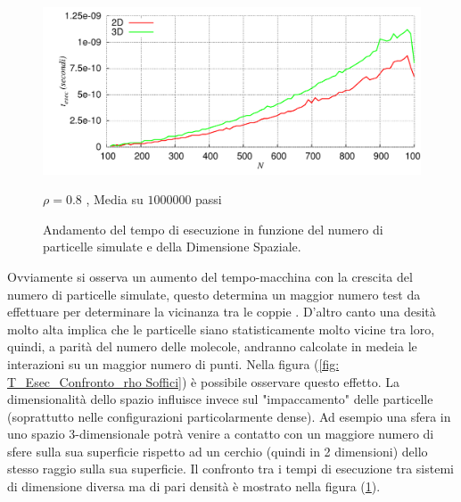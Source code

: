 	\begin{figure}[htbp]
		\centering
		\caption[Sfere Soffici$/$Preliminari\_TempoEsecuzione.cpp]{Andamento del tempo di esecuzione in funzione del numero di particelle simulate e della Dimensione Spaziale.}\label{fig: T_Esec_Confronto_D Soffici}\vspace{-15pt}
		\includegraphics[scale=0.85]{Immagini/Soffici/TempoEsecuzione_ConfrontoD}

		\centering  \footnotesize{$\rho=0.8$ , Media su $ 1000000 $ passi}
	\end{figure}

Ovviamente si osserva un aumento del tempo-macchina con la crescita del numero di particelle simulate, questo determina un maggior numero test da effettuare per determinare la vicinanza tra le coppie .
\newline
D'altro canto una desità molto alta implica che le particelle siano statisticamente molto vicine tra loro, quindi, a parità del numero delle molecole, andranno calcolate in medeia le interazioni su un maggior numero di punti. Nella figura (\ref{fig: T_Esec_Confronto_rho Soffici}) è possibile osservare questo effetto.
\newline
La dimensionalità dello spazio influisce invece sul "impaccamento" delle particelle (soprattutto nelle configurazioni particolarmente dense). Ad esempio una sfera in uno spazio 3-dimensionale potrà venire a contatto con un maggiore numero di sfere sulla sua superficie rispetto ad un cerchio (quindi in 2 dimensioni) dello stesso raggio sulla sua superficie.
Il confronto tra i tempi di esecuzione tra  sistemi di dimensione diversa ma di pari densità è mostrato nella figura (\ref{fig: T_Esec_Confronto_D Soffici}).

